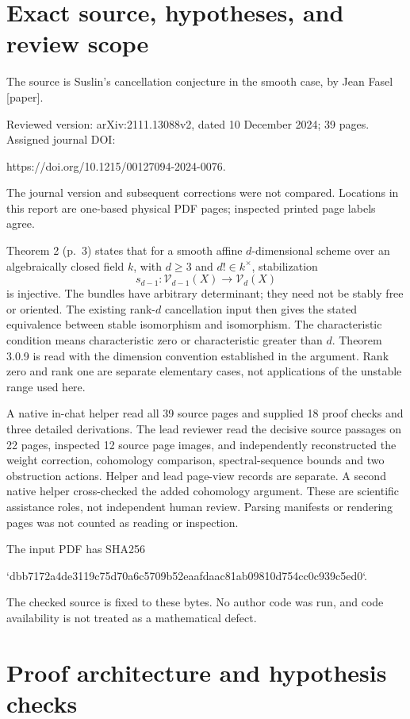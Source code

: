 \documentclass[10pt]{article}
\begin{document}
\section*{Exact source, hypotheses, and review scope}
The source is Suslin’s cancellation conjecture in the smooth case, by Jean Fasel [paper].\par
Reviewed version: arXiv:2111.13088v2, dated 10 December 2024; 39 pages. Assigned journal DOI:\par
https://doi.org/10.1215/00127094-2024-0076.\par
The journal version and subsequent corrections were not compared. Locations in this report are one-based physical PDF pages; inspected printed page labels agree.\par
Theorem 2 (p. 3) states that for a smooth affine \(d\)-dimensional scheme over an algebraically closed field \(k\), with \(d\geq3\) and \(d!\in k^\times\), stabilization \[s_{d-1}:\mathcal V_{d-1}(X)\longrightarrow\mathcal V_d(X)\] is injective. The bundles have arbitrary determinant; they need not be stably free or oriented. The existing rank-\(d\) cancellation input then gives the stated equivalence between stable isomorphism and isomorphism. The characteristic condition means characteristic zero or characteristic greater than \(d\). Theorem 3.0.9 is read with the dimension convention established in the argument. Rank zero and rank one are separate elementary cases, not applications of the unstable range used here.\par
A native in-chat helper read all 39 source pages and supplied 18 proof checks and three detailed derivations. The lead reviewer read the decisive source passages on 22 pages, inspected 12 source page images, and independently reconstructed the weight correction, cohomology comparison, spectral-sequence bounds and two obstruction actions. Helper and lead page-view records are separate. A second native helper cross-checked the added cohomology argument. These are scientific assistance roles, not independent human review. Parsing manifests or rendering pages was not counted as reading or inspection.\par
The input PDF has SHA256\par
`dbb7172a4de3119c75d70a6c5709b52eaafdaac81ab09810d754cc0c939c5ed0`.\par
The checked source is fixed to these bytes. No author code was run, and code availability is not treated as a mathematical defect.\par
\section*{Proof architecture and hypothesis checks}
\end{document}

